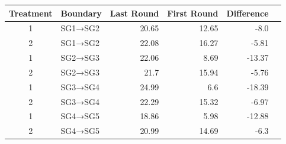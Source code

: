 \begin{tabular}{clrrrr}
  \toprule
  Treatment & Boundary & Last Round & First Round & Difference \\ 
  \midrule
  1 & SG1→SG2 & 20.65 & 12.65 & -8.0 \\ 
  2 & SG1→SG2 & 22.08 & 16.27 & -5.81 \\ 
  1 & SG2→SG3 & 22.06 & 8.69 & -13.37 \\ 
  2 & SG2→SG3 & 21.7 & 15.94 & -5.76 \\ 
  1 & SG3→SG4 & 24.99 & 6.6 & -18.39 \\ 
  2 & SG3→SG4 & 22.29 & 15.32 & -6.97 \\ 
  1 & SG4→SG5 & 18.86 & 5.98 & -12.88 \\ 
  2 & SG4→SG5 & 20.99 & 14.69 & -6.3 \\ 
  \bottomrule
\end{tabular}
